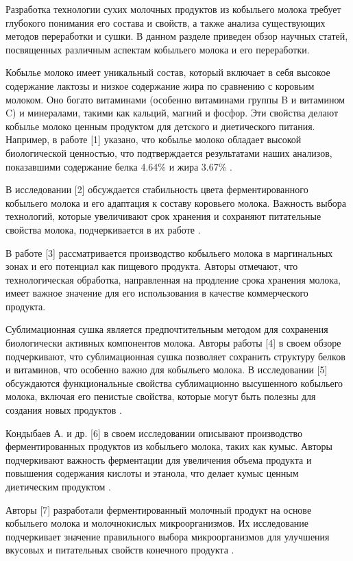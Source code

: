 Разработка технологии сухих молочных продуктов из кобыльего молока
требует глубокого понимания его состава и свойств, а также анализа
существующих методов переработки и сушки. В данном разделе приведен
обзор научных статей, посвященных различным аспектам кобыльего молока и
его переработки.

Кобылье молоко имеет уникальный состав, который включает в себя высокое
содержание лактозы и низкое содержание жира по сравнению с коровьим
молоком. Оно богато витаминами (особенно витаминами группы B и витамином
C) и минералами, такими как кальций, магний и фосфор. Эти свойства
делают кобылье молоко ценным продуктом для детского и диетического
питания. Например, в работе {[}1{]} указано, что кобылье молоко обладает
высокой биологической ценностью, что подтверждается результатами наших
анализов, показавшими содержание белка 4.64\% и жира 3.67\% .

В исследовании {[}2{]} обсуждается стабильность цвета ферментированного
кобыльего молока и его адаптация к составу коровьего молока. Важность
выбора технологий, которые увеличивают срок хранения и сохраняют
питательные свойства молока, подчеркивается в их работе .

В работе {[}3{]} рассматривается производство кобыльего молока в
маргинальных зонах и его потенциал как пищевого продукта. Авторы
отмечают, что технологическая обработка, направленная на продление срока
хранения молока, имеет важное значение для его использования в качестве
коммерческого продукта.

Сублимационная сушка является предпочтительным методом для сохранения
биологически активных компонентов молока. Авторы работы {[}4{]} в своем
обзоре подчеркивают, что сублимационная сушка позволяет сохранить
структуру белков и витаминов, что особенно важно для кобыльего молока. В
исследовании {[}5{]} обсуждаются функциональные свойства сублимационно
высушенного кобыльего молока, включая его пенистые свойства, которые
могут быть полезны для создания новых продуктов .

Кондыбаев А. и др. {[}6{]} в своем исследовании описывают производство
ферментированных продуктов из кобыльего молока, таких как кумыс. Авторы
подчеркивают важность ферментации для увеличения объема продукта и
повышения содержания кислоты и этанола, что делает кумыс ценным
диетическим продуктом .

Авторы {[}7{]} разработали ферментированный молочный продукт на основе
кобыльего молока и молочнокислых микроорганизмов. Их исследование
подчеркивает значение правильного выбора микроорганизмов для улучшения
вкусовых и питательных свойств конечного продукта .

